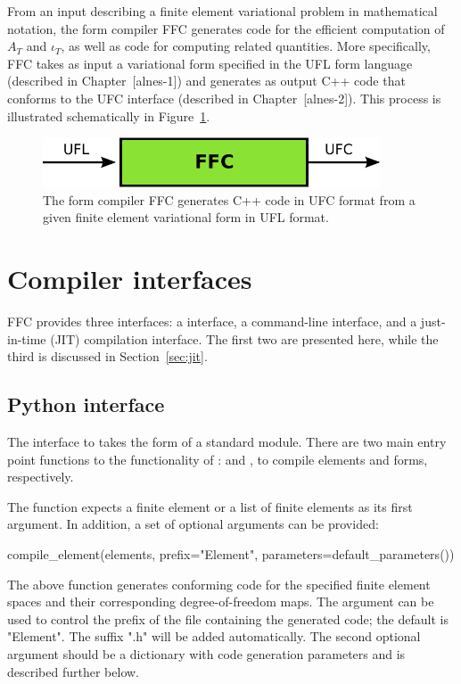 From an input describing a finite element variational problem in
mathematical notation, the form compiler FFC generates code for the
efficient computation of $A_T$ and $\iota_T$, as well as code for
computing related quantities. More specifically, FFC takes as input a
variational form specified in the UFL form language (described in
Chapter~[alnes-1]) and generates as output C++ code that conforms to
the UFC interface (described in Chapter~[alnes-2]). This process is
illustrated schematically in Figure~\ref{fig:formcompiler}.

\begin{figure}
  \begin{center}
    \includegraphics[width=10cm]{chapters/logg-1/pdf/ufl_ffc_ufc.pdf}
    \caption{The form compiler FFC generates C++ code in UFC format
      from a given finite element variational form in UFL format.}
    \label{fig:formcompiler}
  \end{center}
\end{figure}

\section{Compiler interfaces}

FFC provides three interfaces: a \pythonlang{} interface, a
command-line interface, and a just-in-time (JIT) compilation
interface. The first two are presented here, while the third is
discussed in Section~\ref{sec:jit}.

\subsection{Python interface}

The \pythonlang{} interface to \ffc{} takes the form of a standard
\pythonlang{} module. There are two main entry point functions to the
functionality of \ffc{}:  and
, to compile elements and forms, respectively.

The  function expects a finite element or a
list of finite elements as its first argument. In addition, a set of
optional arguments can be provided:
%
\begin{python}
compile_element(elements,
                prefix="Element",
                parameters=default_parameters())
\end{python}
%
The above function generates \ufc{} conforming code for the specified
finite element spaces and their corresponding degree-of-freedom maps. The
 argument can be used to control the prefix of the
file containing the generated code; the default is "Element". The
suffix ".h" will be added automatically. The second optional argument
 should be a \pythonlang{} dictionary with code
generation parameters and is described further below.

